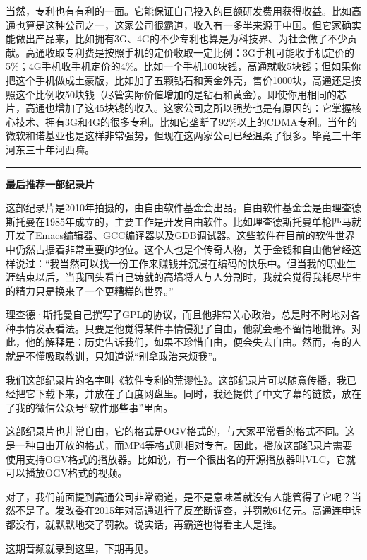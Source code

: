 \documentclass[
  letterpaper,
  DIV=11,
  numbers=noendperiod]{scrreprt}
\begin{document}
当然，专利也有有利的一面。它能保证自己投入的巨额研发费用获得收益。比如高通也算是这种公司之一，这家公司很霸道，收入有一多半来源于中国。但它家确实能做出产品来，比如拥有3G、4G的不少专利也算是为科技界、为社会做了不少贡献。高通收取专利费是按照手机的定价收取一定比例：3G手机可能收手机定价的5\%；4G手机收手机定价的4\%。比如一个手机100块钱，高通就收5块钱；但如果你把这个手机做成土豪版，比如加了五颗钻石和黄金外壳，售价1000块，高通还是按照这个比例收50块钱（尽管实际价值增加的是钻石和黄金）。即使你用相同的芯片，高通也增加了这45块钱的收入。这家公司之所以强势也是有原因的：它掌握核心技术、拥有3G和4G的很多专利。比如它垄断了92\%以上的CDMA专利。当年的微软和诺基亚也是这样非常强势，但现在这两家公司已经温柔了很多。毕竟三十年河东三十年河西嘛。

\begin{center}\rule{0.5\linewidth}{0.5pt}\end{center}

\textbf{最后推荐一部纪录片}

这部纪录片是2010年拍摄的，由自由软件基金会出品。自由软件基金会是由理查德斯托曼在1985年成立的，主要工作是开发自由软件。比如理查德斯托曼单枪匹马就开发了Emacs编辑器、GCC编译器以及GDB调试器。这些软件在目前的软件世界中仍然占据着非常重要的地位。这个人也是个传奇人物，关于金钱和自由他曾经这样说过：``我当然可以找一份工作来赚钱并沉浸在编码的快乐中。但当我的职业生涯结束以后，当我回头看自己铸就的高墙将人与人分割时，我就会觉得我耗尽毕生的精力只是换来了一个更糟糕的世界。''

理查德·斯托曼自己撰写了GPL的协议，而且他非常关心政治，总是时不时地对各种事情发表看法。只要是他觉得某件事情侵犯了自由，他就会毫不留情地批评。对此，他的解释是：历史告诉我们，如果不珍惜自由，便会失去自由。然而，有的人就是不懂吸取教训，只知道说``别拿政治来烦我''。

我们这部纪录片的名字叫《软件专利的荒谬性》。这部纪录片可以随意传播，我已经把它下载下来，并放在了百度网盘里。同时，我还提供了中文字幕的链接，放在了我的微信公众号``软件那些事''里面。

这部纪录片也非常自由，它的格式是OGV格式的，与大家平常看的格式不同。这是一种自由开放的格式，而MP4等格式则相对专有。因此，播放这部纪录片需要使用支持OGV格式的播放器。比如说，有一个很出名的开源播放器叫VLC，它就可以播放OGV格式的视频。

对了，我们前面提到高通公司非常霸道，是不是意味着就没有人能管得了它呢？当然不是了。发改委在2015年对高通进行了反垄断调查，并罚款61亿元。高通连申诉都没有，就默默地交了罚款。说实话，再霸道也得看主人是谁。

这期音频就录到这里，下期再见。
\end{document}
